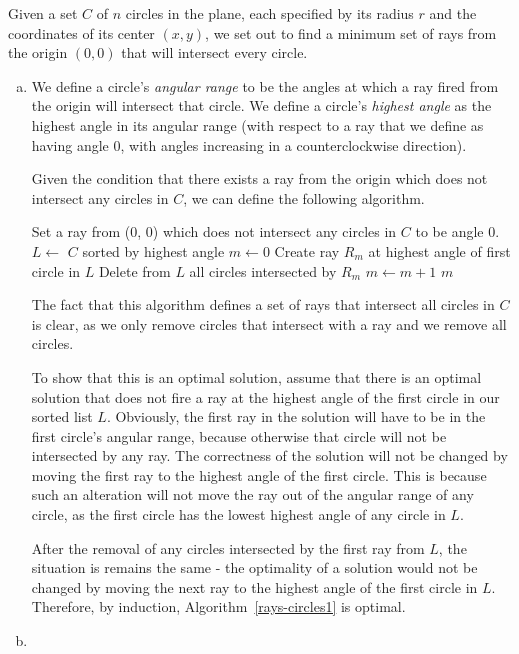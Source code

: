 Given a set $C$ of $n$ circles in the plane, each specified by its radius $r$ and the coordinates of its center $(x, y)$, we set out to find a minimum set of rays from the origin $(0, 0)$ that will intersect every circle.

\begin{enumerate}[(a)]
	\item We define a circle's \emph{angular range} to be the angles at which a ray fired from the origin will intersect that circle. We define a circle's \emph{highest angle} as the highest angle in its angular range (with respect to a ray that we define as having angle 0, with angles increasing in a counterclockwise direction).
	
	Given the condition that there exists a ray from the origin which does not intersect any circles in $C$, we can define the following algorithm.
	
	\begin{algorithm}
		\caption{}
		\label{rays-circles1}
		\begin{algorithmic}
			\State Set a ray from (0, 0) which does not intersect any circles in $C$ to be angle 0.
			\State $L \gets$ $C$ sorted by highest angle
			\State $m \gets 0$
				\State Create ray $R_{m}$ at highest angle of first circle in $L$
				\State Delete from $L$ all circles intersected by $R_{m}$
				\State $m \gets m+1$
			\EndWhile
			\State \Return $m$
		\end{algorithmic}
	\end{algorithm}
	
	The fact that this algorithm defines a set of rays that intersect all circles in $C$ is clear, as we only remove circles that intersect with a ray and we remove all circles. 
	
	To show that this is an optimal solution, assume that there is an optimal solution that does not fire a ray at the highest angle of the first circle in our sorted list $L$. Obviously, the first ray in the solution will have to be in the first circle's angular range, because otherwise that circle will not be intersected by any ray. The correctness of the solution will not be changed by moving the first ray to the highest angle of the first circle. This is because such an alteration will not move the ray out of the angular range of any circle, as the first circle has the lowest highest angle of any circle in $L$. 
	
	After the removal of any circles intersected by the first ray from $L$, the situation is remains the same - the optimality of a solution would not be changed by moving the next ray to the highest angle of the first circle in $L$. Therefore, by induction, Algorithm~\ref{rays-circles1} is optimal.
	\item
\end{enumerate}